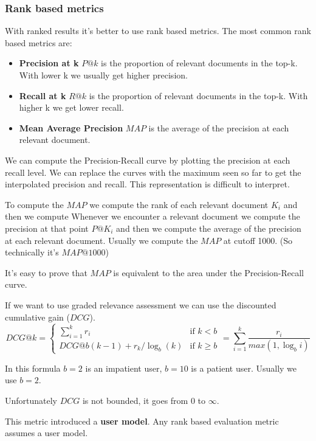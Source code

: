 \subsubsection{Rank based metrics}
\label{sec:rank_based_metrics}

With ranked results it's better to use rank based metrics.
The most common rank based metrics are:
\begin{itemize}
    \item \textbf{Precision at k} $P@k$ is the proportion of relevant documents in the top-k.
    With lower k we usually get higher precision.
    \item \textbf{Recall at k} $R@k$ is the proportion of relevant documents in the top-k.
    With higher k we get lower recall.
    \item \textbf{Mean Average Precision} $MAP$ is the average of the precision 
    at each relevant document.
\end{itemize}

We can compute the Precision-Recall curve by plotting the precision at each recall level.
We can replace the curves with the maximum seen so far to get the interpolated precision 
and recall. This representation is difficult to interpret.

To compute the $MAP$ we compute the rank of each relevant document $K_i$ and then we compute
Whenever we encounter a relevant document we compute the precision at that point $P@K_i$ and
then we compute the average of the precision at each relevant document. Usually we compute
the $MAP$ at cutoff 1000. (So technically it's $MAP@1000$)

It's easy to prove that $MAP$ is equivalent to the area under the Precision-Recall curve.

If we want to use graded relevance assessment we can use the discounted cumulative gain ($DCG$).
\[
    DCG@k = 
    \begin{cases}
        \sum_{i=1}^k r_i & \text{if } k < b \\
        DCG@b(k-1)+r_k/\log_b(k) & \text{if } k \geq b
    \end{cases}
    = \sum_{i=1}^k\frac{r_i}{max(1,\log_bi)}
\]

In this formula $b=2$ is an impatient user, $b=10$ is a patient user.
Usually we use $b=2$.

Unfortunately $DCG$ is not bounded, it goes from 0 to $\infty$.

This metric introduced a \textbf{user model}. Any rank based evaluation metric assumes
a user model.

